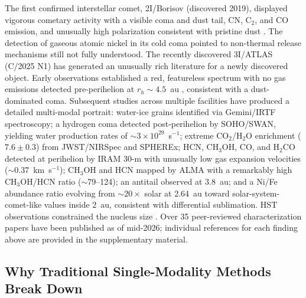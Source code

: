 \documentclass[usenatbib]{mnras}
\begin{document}
The first confirmed interstellar comet, 2I/Borisov (discovered 2019), displayed vigorous cometary activity with a visible coma and dust tail, CN, C$_2$, and CO emission, and unusually high polarization consistent with pristine dust \citep{guzik19,jewitt19,fitzsimmons19,bodewits20,bagnulo21}. The detection of gaseous atomic nickel in its cold coma \citep{guzik21} pointed to non-thermal release mechanisms still not fully understood. The recently discovered 3I/ATLAS (C/2025 N1) has generated an unusually rich literature for a newly discovered object. Early observations established a red, featureless spectrum with no gas emissions detected pre-perihelion at $r_h \sim 4.5$~au \citep{opitom20}, consistent with a dust-dominated coma. Subsequent studies across multiple facilities have produced a detailed multi-modal portrait: water-ice grains identified via Gemini/IRTF spectroscopy; a hydrogen coma detected post-perihelion by SOHO/SWAN, yielding water production rates of $\sim 3 \times 10^{29}$~s$^{-1}$; extreme CO$_2$/H$_2$O enrichment ($7.6 \pm 0.3$) from JWST/NIRSpec and SPHEREx; HCN, CH$_3$OH, CO, and H$_2$CO detected at perihelion by IRAM 30-m with unusually low gas expansion velocities ($\sim 0.37$~km~s$^{-1}$); CH$_3$OH and HCN mapped by ALMA with a remarkably high CH$_3$OH/HCN ratio ($\sim$79--124); an antitail observed at 3.8~au; and a Ni/Fe abundance ratio evolving from $\sim 20\times$ solar at 2.64~au toward solar-system-comet-like values inside 2~au, consistent with differential sublimation. HST observations constrained the nucleus size \citep{jewitt25}. Over 35 peer-reviewed characterization papers have been published as of mid-2026; individual references for each finding above are provided in the supplementary material. %

\subsection{Why Traditional Single-Modality Methods Break Down}
\end{document}
